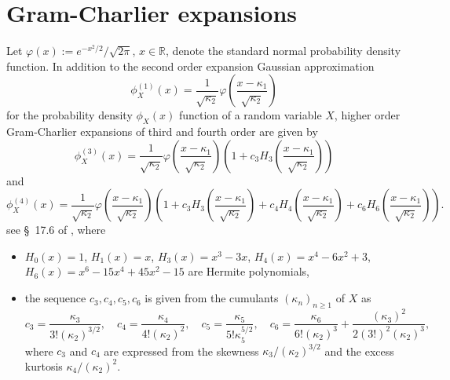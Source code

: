 \documentclass[12pt]{article}
\def\real{{\mathord{\mathbb R}}}
\numberwithin{equation}{section}
\begin{document}
\section{Gram-Charlier expansions}
\label{s5}
\noindent
 Let $\varphi(x) := e^{-x^2/2} / \sqrt{2\pi}$,
 $x\in \real$,
 denote the standard normal probability density function. 
 In addition to the second order expansion Gaussian approximation 
\begin{equation} 
\label{gram_charlier-1}
\phi_X^{(1)}(x)=
\frac{1}{\sqrt{\kappa_2}}
\varphi \left( \frac{x-\kappa_1}{\sqrt{\kappa_2}}\right)
\end{equation}
for the probability density $\phi_X(x)$
function of a random variable $X$,
higher order Gram-Charlier expansions of 
 third and fourth order are given by 
\begin{equation} 
\label{gram_charlier-2}
\phi_X^{(3)}(x)=
\frac{1}{\sqrt{\kappa_2}}
\varphi \left( \frac{x-\kappa_1}{\sqrt{\kappa_2}}\right)
\left( 1 +
c_3 H_3\left(
\frac{x-\kappa_1}{\sqrt{\kappa_2}} \right)
\right)
\end{equation}
 and
\begin{equation} 
\nonumber %
\phi_X^{(4)}(x)=
\frac{1}{\sqrt{\kappa_2}}
\varphi \left( \frac{x-\kappa_1}{\sqrt{\kappa_2}}\right)
\left( 1 +
c_3 H_3\left(
\frac{x-\kappa_1}{\sqrt{\kappa_2}} \right)
+
c_4 H_4\left(
\frac{x-\kappa_1}{\sqrt{\kappa_2}} \right)
 + c_6 H_6\left( \frac{x-\kappa_1}{\sqrt{\kappa_2}} \right)
 \right).
\end{equation}
 see \S~17.6 of \cite{cramer}, where 
\begin{itemize}
\item 
$H_0(x)=1$, 
$H_1(x)=x$, 
$H_3(x)=x^3-3x$,
$H_4(x)=x^4-6x^2+3$, 
$H_6(x)=x^6-15x^4+45x^2-15$ 
 are Hermite polynomials, 
 \item 
  the sequence $c_3,c_4,c_5,c_6$ is given from the cumulants $(\kappa_n)_{n\geq 1}$
of $X$ as 
$$ 
c_3 = \frac{\kappa_3}{3! (\kappa_2)^{3/2}}, 
\quad
c_4 = \frac{\kappa_4}{4! (\kappa_2)^2}, 
\quad 
c_5 = \frac{\kappa_5}{5! \kappa_5^{5/2}},
\quad
 c_6 =
 \frac{\kappa_6}{6! (\kappa_2)^3}
 +
  \frac{(\kappa_3)^2}{2(3!)^2 (\kappa_2)^3}, 
$$
 where $c_3$ and $c_4$ are expressed from 
 the skewness $\kappa_3/(\kappa_2)^{3/2}$ and
 the excess kurtosis $\kappa_4/(\kappa_2)^2$.
\end{itemize} 
\noindent
\end{document}
